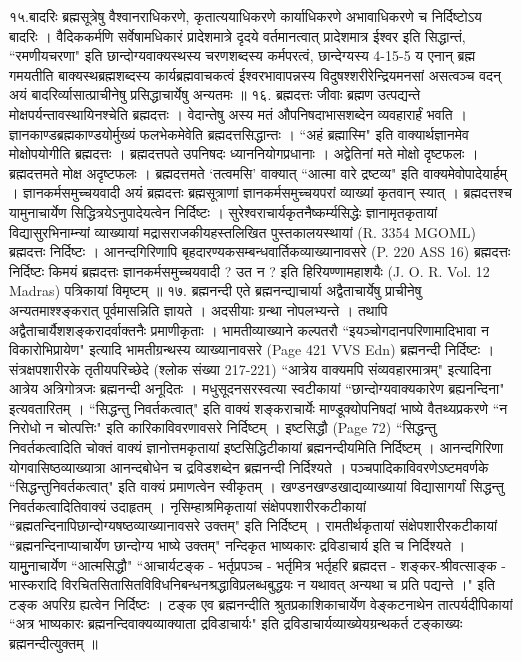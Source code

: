 १५.बादरिः
ब्रह्मसूत्रेषु वैश्वानराधिकरणे, कृतात्ययाधिकरणे कार्याधिकरणे अभावाधिकरणे च निर्दिष्टोऽय बादरिः । वैदिककर्मणि सर्वेषामधिकारं प्रादेशमात्रे दृदये वर्तमानत्वात् प्रादेशमात्र ईश्वर इति सिद्धान्तं, ``रमणीयचरणा" इति छान्दोग्यवाक्यस्थस्य चरणशब्दस्य कर्मपरत्वं, छान्देग्यस्य 4-15-5 य एनान् ब्रह्म गमयतीति बाक्यस्थब्रह्मशब्दस्य कार्यब्रह्मवाचकत्वं ईश्वरभावापन्नस्य विदुषश्शरीरेन्द्रियमनसां असत्वञ्च वदन् अयं बादरिर्व्यासात्प्राचीनेषु प्रसिद्धाचार्येषु अन्यतमः ॥
१६. ब्रह्मदत्तः
जीवाः ब्रह्मण उत्पद्यन्ते मोक्षपर्यन्तावस्थायिनश्चेति ब्रह्मदत्तः । वेदान्तेषु अस्य मतं औपनिषदाभासशब्देन व्यवहारार्हं भवति । ज्ञानकाण्डब्रह्मकाण्डयोर्मुख्यं फलभेकमेवेति ब्रह्मदत्तसिद्धान्तः । ``अहं ब्रह्मास्मि" इति वाक्यार्थज्ञानमेव मोक्षोपयोगीति ब्रह्मदत्तः । ब्रह्मदत्तपते उपनिषदः ध्याननियोगप्रधानाः । अद्वेतिनां मते मोक्षो दृष्टफलः । ब्रह्मदत्तमते मोक्ष अदृष्टफलः । ब्रह्मदत्तमते `तत्वमसि' वाक्यात् ``आत्मा वारे द्रष्टव्य" इति वाक्यमेवोपादेयार्हम् ।
ज्ञानकर्मसमुच्चयवादी अयं ब्रह्मदत्तः ब्रह्मसूत्राणां ज्ञानकर्मसमुच्चयपरां व्याख्यां कृतवान् स्यात् । ब्रह्मदत्तश्च यामुनाचार्येण सिद्धित्रयेऽनुपादेयत्वेन निर्दिष्टः । सुरेश्वराचार्यकृतनैष्कर्म्यसिद्धेः ज्ञानामृतकृतायां विद्यासुरभिनाम्न्यां व्याख्यायां मद्रासराजकीयहस्तलिखित पुस्तकालयस्थायां (R. 3354 MGOML) ब्रह्मदत्तः निर्दिष्टः । आनन्दगिरिणापि बृहदारण्यकसम्बन्धवार्तिकव्याख्यानावसरे (P. 220 ASS 16) ब्रह्मदत्तः निर्दिष्टः 
किमयं ब्रह्मदत्तः ज्ञानकर्मसमुच्चयवादी ? उत न ? इति हिरियण्णामहाशयैः (J. O. R. Vol. 12 Madras) पत्रिकायां विमृष्टम् ॥
१७. ब्रह्मनन्दी
एते ब्रह्मनन्द्याचार्या अद्वैताचार्येषु प्राचीनेषु अन्यतमाश्श्ङ्करात् पूर्वमासन्निति ज्ञायते । अदसीयाः ग्रन्था नोपलभ्यन्ते । तथापि अद्वैताचार्यैशशङ्करादर्वाक्तनैः प्रमाणीकृताः । 
भामतीव्याख्याने कल्पतरौ ``इयञ्चोगदानपरिणामादिभावा न विकारोभिप्रायेण" इत्यादि भामतीग्रन्थस्य व्याख्यानावसरे (Page 421 VVS Edn) ब्रह्मनन्दी निर्दिष्टः । संत्रक्षपशारीरके तृतीयपरिच्छेदे (श्लोक संख्या 217-221) ``आत्रेय वाक्यमपि संव्यवहारमात्रम्" इत्यादिना आत्रेय अत्रिगोत्रजः ब्रह्मनन्दी अनूदितः । मधुसूदनसरस्वत्या स्वटीकायां ``छान्दोग्यवाक्यकारेण ब्रह्यनन्दिना" इत्यवतारितम् । ``सिद्धन्तु निवर्तकत्वात्" इति वाक्यं शङ्कराचार्येः माण्डूक्योपनिषदां भाष्ये वैतथ्यप्रकरणे ``न निरोधो न चोत्पत्तिः" इति कारिकाविवरणावसरे निर्दिष्टम् । इष्टसिद्धौ (Page 72) ``सिद्धन्तु निवर्तकत्वादिति चोक्तं वाक्यं ज्ञानोत्तमकृतायां इष्टसिद्धिटीकायां ब्रह्मनन्दीयमिति निर्दिष्टम् । आनन्दगिरिणा योगवासिष्ठव्याख्यात्रा आनन्दबोधेन च द्रविडशब्देन ब्रह्मनन्दी निर्दिश्यते । पञ्चपादिकाविवरणेऽष्टमवर्णके ``सिद्धन्तुनिवर्तकत्वात्" इति वाक्यं प्रमाणत्वेन स्वीकृतम् । खण्डनखण्डखाद्यव्याख्यायां विद्यासागर्यां सिद्धन्तु निवर्तकत्वादितिवाक्यं उदाहृतम् । नृसिम्हाश्रमिकृतायां संक्षेपपशारीरकटीकायां ``ब्रह्मतन्दिनापिछान्दोग्यषष्ठव्याख्यानावसरे उक्तम्" इति निर्दिष्टम् । रामतीर्थकृतायां संक्षेपशारीरकटीकायां ``ब्रह्मनन्दिनाप्याचार्येण छान्दोग्य भाष्ये उक्तम्" नन्दिकृत भाष्यकारः द्रविडाचार्य इति च निर्दिश्यते । यामुुुनाचार्येण ``आत्मसिद्धौ" ``आचार्यटङ्क - भर्तृप्रपञ्च - भर्तृमित्र भर्तृहरि ब्रह्मदत्त - शङ्कर-श्रीवत्साङ्क - भास्करादि विरचितसितासितविविधनिबन्धनश्रद्धाविप्रलब्धबुद्धयः न यथावत् अन्यथा च प्रति पद्यन्ते ।" इति टङ्क अपरिग्र ह्यत्वेन निर्दिष्टः । टङ्क एव ब्रह्मनन्दीति श्रुतप्रकाशिकाचार्येण वेङ्कटनाथेन तात्पर्यदीपिकायां ``अत्र भाष्यकारः ब्रह्मनन्दिवाक्यव्याक्याता द्रविडाचार्यः" इति द्रविडाचार्यव्याख्येयग्रन्थकर्त टङ्काख्यः ब्रह्मनन्दीत्युक्तम् ॥
